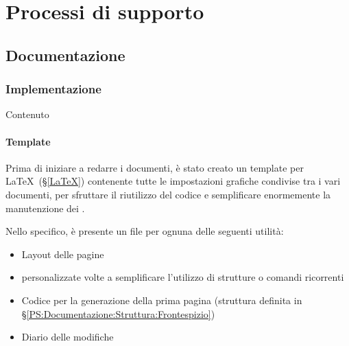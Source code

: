 
\section{Processi di supporto}\label{PS}

	\subsection{Documentazione}\label{PS:Documentazione}


		\subsubsection{Implementazione}\label{PS:Documentazione:Implementazione}
		Contenuto

			\paragraph{Template}\label{PS:Documentazione:Implementazione:Template}
			Prima di iniziare a redarre i documenti, è stato creato un template per \LaTeX \ (\S\ref{LaTeX})
			contenente tutte le impostazioni grafiche condivise tra i vari documenti, per sfruttare il riutilizzo
			del codice e semplificare enormemente la manutenzione dei .\par
			Nello specifico, è presente un file per ognuna delle seguenti utilità:
			\begin{itemize}
				\item Layout delle pagine
				\item {} personalizzate volte a semplificare l'utilizzo di strutture o comandi ricorrenti
				\item Codice per la generazione della prima pagina
					(struttura definita in \S\ref{PS:Documentazione:Struttura:Frontespizio})
				\item Diario delle modifiche
			\end{itemize}

